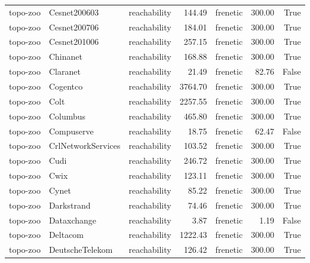 \begin{tabular}{lllrlrr}
topo-zoo & Cesnet200603 & reachability & 144.49 & frenetic & 300.00 & True \\
topo-zoo & Cesnet200706 & reachability & 184.01 & frenetic & 300.00 & True \\
topo-zoo & Cesnet201006 & reachability & 257.15 & frenetic & 300.00 & True \\
topo-zoo & Chinanet & reachability & 168.88 & frenetic & 300.00 & True \\
topo-zoo & Claranet & reachability & 21.49 & frenetic & 82.76 & False \\
topo-zoo & Cogentco & reachability & 3764.70 & frenetic & 300.00 & True \\
topo-zoo & Colt & reachability & 2257.55 & frenetic & 300.00 & True \\
topo-zoo & Columbus & reachability & 465.80 & frenetic & 300.00 & True \\
topo-zoo & Compuserve & reachability & 18.75 & frenetic & 62.47 & False \\
topo-zoo & CrlNetworkServices & reachability & 103.52 & frenetic & 300.00 & True \\
topo-zoo & Cudi & reachability & 246.72 & frenetic & 300.00 & True \\
topo-zoo & Cwix & reachability & 123.11 & frenetic & 300.00 & True \\
topo-zoo & Cynet & reachability & 85.22 & frenetic & 300.00 & True \\
topo-zoo & Darkstrand & reachability & 74.46 & frenetic & 300.00 & True \\
topo-zoo & Dataxchange & reachability & 3.87 & frenetic & 1.19 & False \\
topo-zoo & Deltacom & reachability & 1222.43 & frenetic & 300.00 & True \\
topo-zoo & DeutscheTelekom & reachability & 126.42 & frenetic & 300.00 & True \\
\bottomrule
\end{tabular}
